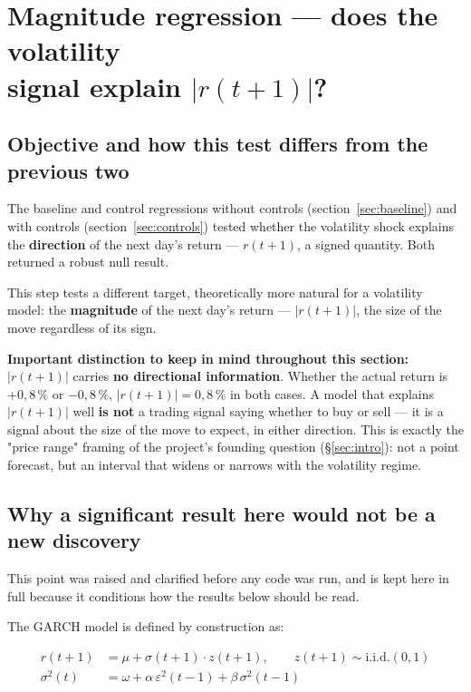 \documentclass[12pt,a4paper]{article}
\begin{document}
\section{Magnitude regression --- does the volatility \\ signal  explain $|r(t+1)|$?}
\label{sec:magnitude}

\subsection{Objective and how this test differs from the previous two}

The baseline and control regressions without controls (section~\ref{sec:baseline}) and with controls
(section~\ref{sec:controls}) tested whether the volatility shock explains the
\textbf{direction} of the next day's return --- $r(t+1)$, a
signed quantity. Both returned a robust null result.

This step tests a different target, theoretically more natural
for a volatility model: the \textbf{magnitude} of the next day's
return --- $|r(t+1)|$, the size of the move regardless of its
sign.

\textbf{Important distinction to keep in mind throughout
	this section:} $|r(t+1)|$ carries \textbf{no directional
	information}. Whether the actual return is $+0{,}8\,\%$ or
$-0{,}8\,\%$, $|r(t+1)| = 0{,}8\,\%$ in both cases. A model that
explains $|r(t+1)|$ well \textbf{is not} a trading signal saying
whether to buy or sell --- it is a signal about the size of the move to
expect, in either direction. This is exactly the
"price range" framing of the project's founding question
(\S\ref{sec:intro}): not a point forecast, but an interval that
widens or narrows with the volatility regime.

\subsection{Why a significant result here would not be a new discovery}

This point was raised and clarified before any code was run, and
is kept here in full because it conditions how the results
below should be read.

The GARCH model is defined by construction as:

\begin{keyeq}
	\begin{align}
		r(t+1) &= \mu + \sigma(t+1) \cdot z(t+1), \qquad z(t+1) \sim \text{i.i.d.}(0,1) \\
		\sigma^2(t) &= \omega + \alpha\,\varepsilon^2(t-1) + \beta\,\sigma^2(t-1)
	\end{align}
\end{keyeq}
\end{document}
